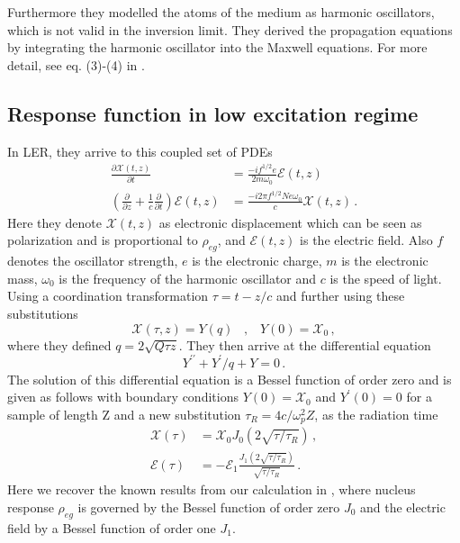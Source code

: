 Furthermore they modelled the atoms of the medium as harmonic oscillators, which is not valid in the inversion limit. They derived the propagation equations by integrating the harmonic oscillator into the Maxwell equations. For more detail, see eq. (3)-(4) in \cite{BURNHAM1969}. 
\subsection{Response function in low excitation regime}
In LER, they arrive to this coupled set of PDEs
\begin{subequations}
\begin{align}
    \frac{\partial \mathcal{X}(t,z)}{\partial t} &= \frac{-i f^{1/2} e}{2m \omega_0} \mathcal{E}(t,z)\label{burnham_1} \\
    \left(\frac{\partial}{\partial z} + \frac{1}{c} \frac{\partial}{\partial t}  \right) \mathcal{E}(t,z) &=  \frac{-i 2\pi f^{1/2}N e\omega_0}{c}  \mathcal{X}(t,z)\, .\label{burnham_2}
\end{align}
\end{subequations}
Here they denote $\mathcal{X}(t,z)$ as electronic displacement which can be seen as polarization and is proportional to $\rho_{eg}$, and $\mathcal{E}(t,z)$ is the electric field. Also $f$ denotes the oscillator strength, $e$ is the electronic charge, $m$ is the electronic mass, $\omega_0$ is the frequency of the harmonic oscillator and $c$ is the speed of light.\\

Using a coordination transformation $\tau = t -z/c$ and further using these substitutions
\begin{equation}
    \mathcal{X}(\tau, z) = Y(q) \;\;\; , \;\;\; Y(0) = \mathcal{X}_0\, ,
\end{equation}
where they defined $q = 2\sqrt{Q\tau z}$. They then arrive at the differential equation
\begin{equation}
    Y^{\prime \prime} + Y^\prime/q + Y = 0\, .\label{burnham_diff}
\end{equation}
The solution of this differential equation is a Bessel function of order zero and is given as follows with boundary conditions $Y(0) = \mathcal{X}_0$ and $Y^\prime (0) = 0$ for a sample of length Z and a new substitution $\tau_R = 4c/\omega_p^2 Z$, as the radiation time
\begin{subequations}
\begin{align}
    \mathcal{X}(\tau) &= \mathcal{X}_0 J_0(2\sqrt{\tau/\tau_R})\, , \label{burnham_sol1}\\
    \mathcal{E}(\tau) &= - \mathcal{E}_1 \frac{J_1(2\sqrt{\tau/\tau_R})}{\sqrt{\tau/\tau_R}}\, .
\end{align}
\end{subequations}
Here we recover the known results from our calculation in , where nucleus response $\rho_{eg}$ is governed by the Bessel function of order zero $J_0$ and the electric field by a Bessel function of order one $J_1$. 
